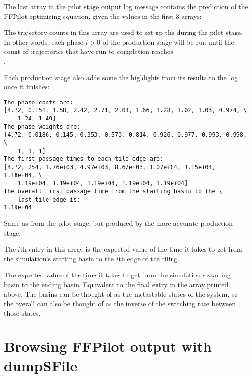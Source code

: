 {The last array in the pilot stage output log message contains the prediction of the FFPilot optimizing equation, given the values in the first 3 arrays:
\begin{description}[style=nextline]
    \item[optimized trajectory counts]
    The trajectory counts in this array are used to set up the  during the pilot stage. In other words, each phase $i>0$ of the production stage will be run until the count of trajectories that have run to completion reaches \\
    .
\end{description}

Each production stage also adds some the highlights from its results to the log once it finishes:
\begin{verbatim}
The phase costs are:
[4.72, 0.151, 1.58, 2.42, 2.71, 2.08, 1.66, 1.28, 1.02, 1.03, 0.974, \
    1.24, 1.49]
The phase weights are:
[4.72, 0.0186, 0.145, 0.353, 0.573, 0.814, 0.926, 0.977, 0.993, 0.998, \
    1, 1, 1]
The first passage times to each tile edge are:
[4.72, 254, 1.76e+03, 4.97e+03, 8.67e+03, 1.07e+04, 1.15e+04, 1.18e+04, \
    1.19e+04, 1.19e+04, 1.19e+04, 1.19e+04, 1.19e+04]
The overall first passage time from the starting basin to the \
    last tile edge is:
1.19e+04
\end{verbatim}

\begin{description}[style=nextline]
    \item[phase costs and weights]
    Same as from the pilot stage, but produced by the more accurate production stage.
    \item[mean first passage times] The $i$th entry in this array is the expected value of the time it takes to get from the simulation's starting basin to the $i$th edge of the tiling.
    \item[overall mean first passage time] The expected value of the time it takes to get from the simulation's starting basin to the ending basin. Equivalent to the final entry in the  array printed above. The basins can be thought of as the metastable states of the system, so the overall  can also be thought of as the inverse of the switching rate between those states.
\end{description}

\section{Browsing FFPilot output with dumpSFile}

}
